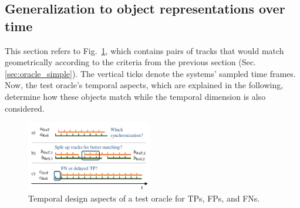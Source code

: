 \documentclass[conference]{IEEEtran}
\begin{document}

\subsection{Generalization to object representations over time}
\label{sec:oracle_time}


This section refers to Fig.~\ref{fig:timeline}, which contains pairs of tracks that would match geometrically according to the criteria from the previous section (Sec. \ref{sec:oracle_simple}). 
The vertical ticks denote the systems' sampled time frames.
Now, the test oracle's temporal aspects, which are explained in the following, determine how these objects match while the temporal dimension is also considered.



\begin{figure}[t]
	\centering
	\vspace*{2mm}
	\includegraphics[width=0.49\textwidth]{img/timeline.pdf}
	\caption{Temporal design aspects of a test oracle for TPs, FPs, and FNs.
	}
	\label{fig:timeline}
\end{figure}
\end{document}
